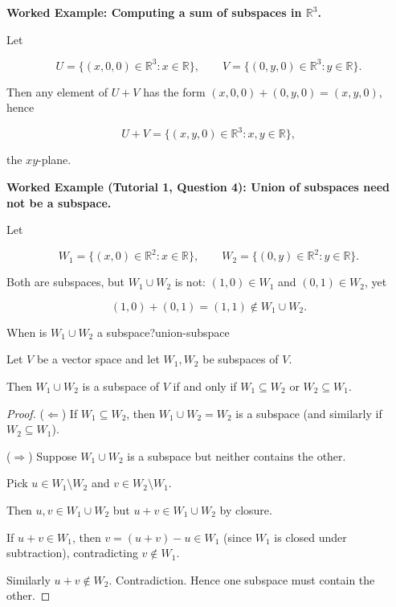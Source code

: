 \begin{examplebox}

\textbf{Worked Example: Computing a sum of subspaces in $\mathbb{R}^3$.}

Let

\[
U=\{(x,0,0)\in\mathbb{R}^3: x\in\mathbb{R}\},\qquad
V=\{(0,y,0)\in\mathbb{R}^3: y\in\mathbb{R}\}.
\]

Then any element of $U+V$ has the form $(x,0,0)+(0,y,0)=(x,y,0)$, hence

\[
U+V=\{(x,y,0)\in\mathbb{R}^3: x,y\in\mathbb{R}\},
\]

the $xy$-plane.

\end{examplebox}

\begin{examplebox}

\textbf{Worked Example (Tutorial 1, Question 4): Union of subspaces need not be a subspace.}

Let

\[
W_1=\{(x,0)\in\mathbb{R}^2:x\in\mathbb{R}\},\qquad
W_2=\{(0,y)\in\mathbb{R}^2:y\in\mathbb{R}\}.
\]

Both are subspaces, but $W_1\cup W_2$ is not: $(1,0)\in W_1$ and $(0,1)\in W_2$, yet

\[
(1,0)+(0,1)=(1,1)\notin W_1\cup W_2.
\]

\end{examplebox}

\begin{theorem}{When is $W_1\cup W_2$ a subspace?}{union-subspace}

Let $V$ be a vector space and let $W_1,W_2$ be subspaces of $V$.

Then $W_1\cup W_2$ is a subspace of $V$ if and only if $W_1\subseteq W_2$ or $W_2\subseteq W_1$.

\end{theorem}

\begin{proof}

($\Leftarrow$) If $W_1\subseteq W_2$, then $W_1\cup W_2=W_2$ is a subspace (and similarly if $W_2\subseteq W_1$).

($\Rightarrow$) Suppose $W_1\cup W_2$ is a subspace but neither contains the other.

Pick $u\in W_1\setminus W_2$ and $v\in W_2\setminus W_1$.

Then $u,v\in W_1\cup W_2$ but $u+v\in W_1\cup W_2$ by closure.

If $u+v\in W_1$, then $v=(u+v)-u\in W_1$ (since $W_1$ is closed under subtraction), contradicting $v\notin W_1$.

Similarly $u+v\notin W_2$. Contradiction. Hence one subspace must contain the other.

\end{proof}

